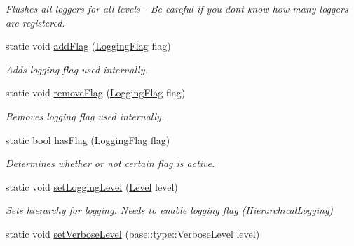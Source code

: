 \begin{DoxyCompactItemize}
\begin{DoxyCompactList}\small\item\em Flushes all loggers for all levels -\/ Be careful if you dont know how many loggers are registered. \end{DoxyCompactList}\item 
static void \hyperlink{classel_1_1Loggers_aedd2de02dd701b0f20ddaa10f1f728f1}{add\+Flag} (\hyperlink{namespaceel_a2784aacd04cb7816ac1c0b20fcbf83cb}{Logging\+Flag} flag)\hypertarget{classel_1_1Loggers_aedd2de02dd701b0f20ddaa10f1f728f1}{}\label{classel_1_1Loggers_aedd2de02dd701b0f20ddaa10f1f728f1}

\begin{DoxyCompactList}\small\item\em Adds logging flag used internally. \end{DoxyCompactList}\item 
static void \hyperlink{classel_1_1Loggers_a23fcb4b492f70a34285c45c0b5e2e515}{remove\+Flag} (\hyperlink{namespaceel_a2784aacd04cb7816ac1c0b20fcbf83cb}{Logging\+Flag} flag)\hypertarget{classel_1_1Loggers_a23fcb4b492f70a34285c45c0b5e2e515}{}\label{classel_1_1Loggers_a23fcb4b492f70a34285c45c0b5e2e515}

\begin{DoxyCompactList}\small\item\em Removes logging flag used internally. \end{DoxyCompactList}\item 
static bool \hyperlink{classel_1_1Loggers_a591a45565c1eb7073ec3a979df8b5a4c}{has\+Flag} (\hyperlink{namespaceel_a2784aacd04cb7816ac1c0b20fcbf83cb}{Logging\+Flag} flag)\hypertarget{classel_1_1Loggers_a591a45565c1eb7073ec3a979df8b5a4c}{}\label{classel_1_1Loggers_a591a45565c1eb7073ec3a979df8b5a4c}

\begin{DoxyCompactList}\small\item\em Determines whether or not certain flag is active. \end{DoxyCompactList}\item 
static void \hyperlink{classel_1_1Loggers_afbee019d722fef5148d8355f45ba7993}{set\+Logging\+Level} (\hyperlink{namespaceel_ab0ac6091262344c52dd2d3ad099e8e36}{Level} level)\hypertarget{classel_1_1Loggers_afbee019d722fef5148d8355f45ba7993}{}\label{classel_1_1Loggers_afbee019d722fef5148d8355f45ba7993}

\begin{DoxyCompactList}\small\item\em Sets hierarchy for logging. Needs to enable logging flag (Hierarchical\+Logging) \end{DoxyCompactList}\item 
static void \hyperlink{classel_1_1Loggers_a826b238fe4f3719305a2d19f0c121fa0}{set\+Verbose\+Level} (base\+::type\+::\+Verbose\+Level level)\hypertarget{classel_1_1Loggers_a826b238fe4f3719305a2d19f0c121fa0}{}\label{classel_1_1Loggers_a826b238fe4f3719305a2d19f0c121fa0}


\end{DoxyCompactItemize}
